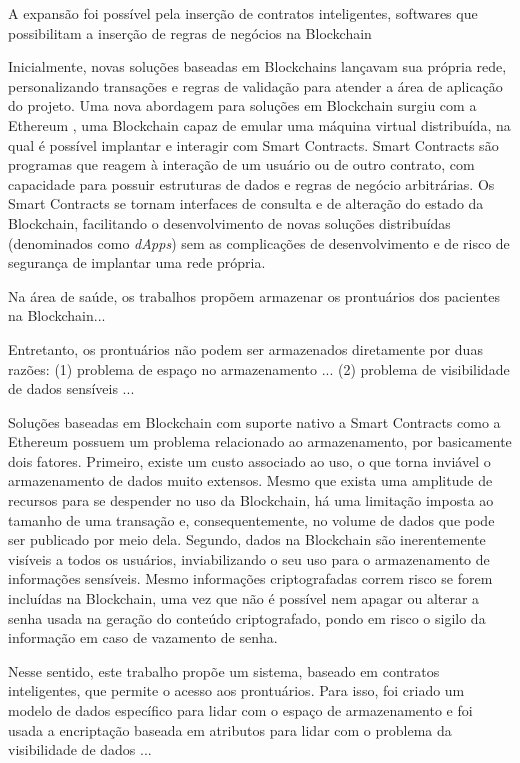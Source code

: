 \documentclass[a4paper,11pt]{article}
\begin{document}
{\color{blue} A expansão foi possível pela inserção de contratos inteligentes, softwares que possibilitam a inserção de regras de negócios na Blockchain}

Inicialmente, novas soluções baseadas em Blockchains lançavam sua própria rede, personalizando transações e regras de validação para atender a área de aplicação do projeto.
Uma nova abordagem para soluções em Blockchain surgiu com a Ethereum \cite{Buterin2014}, uma Blockchain capaz de emular uma máquina virtual distribuída, na qual é possível implantar e interagir com Smart Contracts.
Smart Contracts são programas que reagem à interação de um usuário ou de outro contrato, com capacidade para possuir estruturas de dados e regras de negócio arbitrárias.
Os Smart Contracts se tornam interfaces de consulta e de alteração do estado da Blockchain, facilitando o desenvolvimento de novas soluções distribuídas (denominados como \emph{dApps}) sem as complicações de desenvolvimento e de risco de segurança de implantar uma rede própria.

{\color{blue} Na área de saúde, os trabalhos propõem armazenar os prontuários dos pacientes na Blockchain...}

{\color{blue} Entretanto, os prontuários não podem ser armazenados diretamente por duas razões: (1) problema de espaço no armazenamento ... (2) problema de visibilidade de dados sensíveis ...}

Soluções baseadas em Blockchain com suporte nativo a Smart Contracts como a Ethereum possuem um problema relacionado ao armazenamento, por basicamente dois fatores.
Primeiro, existe um custo associado ao uso, o que torna inviável o armazenamento de dados muito extensos.
Mesmo que exista uma amplitude de recursos para se despender no uso da Blockchain, há uma limitação imposta ao tamanho de uma transação e, consequentemente, no volume de dados que pode ser publicado por meio dela.
Segundo, dados na Blockchain são inerentemente visíveis a todos os usuários, inviabilizando o seu uso para o armazenamento de informações sensíveis.
Mesmo informações criptografadas correm risco se forem incluídas na Blockchain, uma vez que não é possível nem apagar ou alterar a senha usada na geração do conteúdo criptografado, pondo em risco o sigilo da informação em caso de vazamento de senha.

{\color{blue} Nesse sentido, este trabalho propõe um sistema, baseado em contratos inteligentes, que permite o acesso aos prontuários. Para isso, foi criado um modelo de dados específico para lidar com o espaço de armazenamento e foi usada a encriptação baseada em atributos para lidar com o problema da visibilidade de dados ...}
\end{document}
